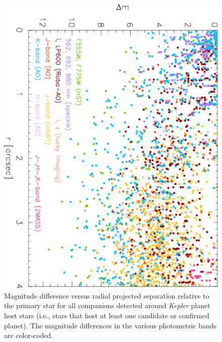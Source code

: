 \documentclass[twocolumn,appendixfloats]{aastex6}
\begin{document}
\begin{figure}[!t]
\centering
\includegraphics[angle=90, scale=0.54]{KOI_planets_imaging.pdf}
\caption{Magnitude difference versus radial projected separation relative to the
primary star for all companions detected around {\it Kepler} planet host stars 
(i.e., stars that host at least one candidate or confirmed planet). The 
magnitude differences in the various photometric bands are color-coded. 
\label{KOI_planets_delta_m_radius}}
\end{figure}
\end{document}
